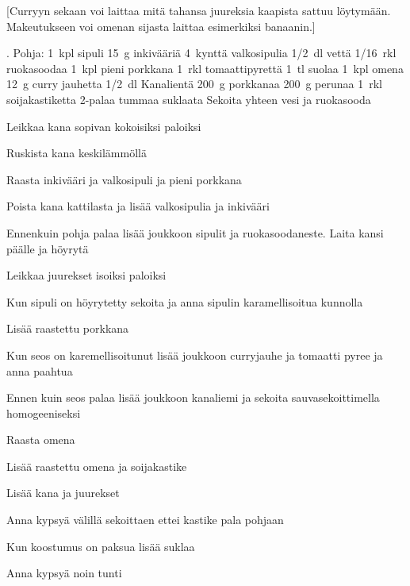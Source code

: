 [Curryyn sekaan voi laittaa mitä tahansa juureksia kaapista sattuu löytymään. Makeutukseen voi omenan sijasta laittaa esimerkiksi banaanin.]


\begin{step}
  . Pohja:
  1~kpl sipuli
  15~g inkivääriä
  4~kynttä valkosipulia
  1/2~dl vettä
  1/16~rkl ruokasoodaa
  1~kpl pieni porkkana
  1~rkl tomaattipyrettä
  1~tl suolaa
  1~kpl omena
  12~g curry jauhetta
  1/2~dl Kanalientä
  200~g porkkanaa
  200~g perunaa
  1~rkl soijakastiketta
  2-palaa tummaa suklaata
  \method
  Sekoita yhteen vesi ja ruokasooda

  Leikkaa kana sopivan kokoisiksi paloiksi

  Ruskista kana keskilämmöllä

  Raasta inkivääri ja valkosipuli ja pieni porkkana

  Poista kana kattilasta ja lisää valkosipulia ja inkivääri

  Ennenkuin pohja palaa lisää joukkoon sipulit ja ruokasoodaneste. Laita kansi päälle ja höyrytä

  Leikkaa juurekset isoiksi paloiksi

  Kun sipuli on höyrytetty sekoita ja anna sipulin karamellisoitua kunnolla

  Lisää raastettu porkkana

  Kun seos on karemellisoitunut lisää joukkoon curryjauhe ja tomaatti pyree ja anna paahtua

  Ennen kuin seos palaa lisää joukkoon kanaliemi ja sekoita sauvasekoittimella homogeeniseksi

  Raasta omena

  Lisää raastettu omena ja soijakastike

  Lisää kana ja juurekset

  Anna kypsyä välillä sekoittaen ettei kastike pala pohjaan

  Kun koostumus on paksua lisää suklaa

  Anna kypsyä noin tunti

\end{step}
